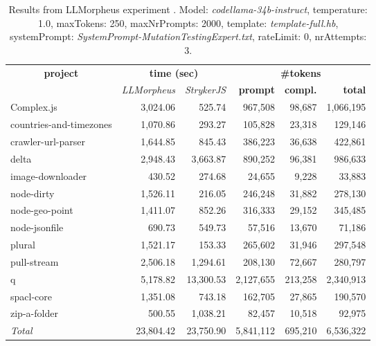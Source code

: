 
\begin{table*}[hbt!]
\centering
{\scriptsize
\begin{tabular}{l||r|r|r|r|r}
\multicolumn{1}{c|}{\bf project} & \multicolumn{2}{|c|}{\bf time (sec)} & \multicolumn{3}{|c|}{\bf \#tokens} \\
               & {\it LLMorpheus} & {\it StrykerJS} & {\bf prompt} & {\bf compl.} & {\bf total} \\
\hline
  Complex.js & 3,024.06 & 525.74 & 967,508 & 98,687 & 1,066,195 \\ 
countries-and-timezones & 1,070.86 & 293.27 & 105,828 & 23,318 & 129,146 \\ 
crawler-url-parser & 1,644.85 & 845.43 & 386,223 & 36,638 & 422,861 \\ 
delta & 2,948.43 & 3,663.87 & 890,252 & 96,381 & 986,633 \\ 
image-downloader & 430.52 & 274.68 & 24,655 & 9,228 & 33,883 \\ 
node-dirty & 1,526.11 & 216.05 & 246,248 & 31,882 & 278,130 \\ 
node-geo-point & 1,411.07 & 852.26 & 316,333 & 29,152 & 345,485 \\ 
node-jsonfile & 690.73 & 549.73 & 57,516 & 13,670 & 71,186 \\ 
plural & 1,521.17 & 153.33 & 265,602 & 31,946 & 297,548 \\ 
pull-stream & 2,506.18 & 1,294.61 & 208,130 & 72,667 & 280,797 \\ 
q & 5,178.82 & 13,300.53 & 2,127,655 & 213,258 & 2,340,913 \\ 
spacl-core & 1,351.08 & 743.18 & 162,705 & 27,865 & 190,570 \\ 
zip-a-folder & 500.55 & 1,038.21 & 82,457 & 10,518 & 92,975 \\ 
\hline
  \textit{Total} & 23,804.42 & 23,750.90 & 5,841,112 & 695,210 & 6,536,322 \\
  \end{tabular}
  }
  \\[2mm]
  \caption{Results from LLMorpheus experiment .
    Model: \textit{codellama-34b-instruct}, 
    temperature: 1.0, 
    maxTokens: 250, 
    maxNrPrompts: 2000, 
    template: \textit{template-full.hb}, 
    systemPrompt: \textit{SystemPrompt-MutationTestingExpert.txt}, 
    rateLimit: 0, 
    nrAttempts: 3.  
  }
  \label{table:Cost:run343:codellama-34b-instruct:template-full.hb:1.0}
\end{table*}
